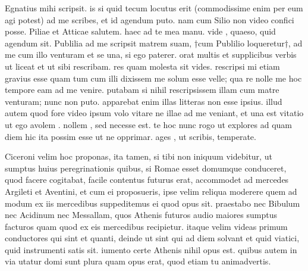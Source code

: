 


 Egnatius mihi scripsit. is si quid tecum locutus erit (commodissime enim per eum agi potest) ad me scribes, et id agendum puto. nam cum Silio non video confici posse. Piliae et Atticae salutem. haec ad te mea manu. vide , quaeso, quid agendum sit. Publilia ad me scripsit matrem suam, †cum Publilio loqueretur†, ad me cum illo venturam et se una, si ego paterer. orat multis et supplicibus verbis ut liceat et ut sibi rescribam. res quam molesta sit vides. rescripsi mi etiam gravius esse quam tum cum illi dixissem me solum esse velle; qua re nolle me hoc tempore eam ad me venire. putabam si nihil rescripsissem illam cum matre venturam; nunc non puto. apparebat enim illas litteras non esse ipsius. illud autem quod fore video ipsum volo vitare ne illae ad me veniant, et una est vitatio ut ego avolem . nollem , sed necesse est. te hoc nunc rogo ut explores ad quam diem hic ita possim esse ut ne opprimar. ages , ut scribis, temperate.

 Ciceroni velim hoc proponas, ita tamen, si tibi non iniquum videbitur, ut sumptus huius peregrinationis quibus, si Romae esset domumque conduceret, quod facere cogitabat, facile contentus futurus erat, accommodet ad mercedes Argileti et Aventini, et cum ei proposueris, ipse velim reliqua moderere quem ad modum ex iis mercedibus suppeditemus ei quod opus sit. praestabo nec Bibulum nec Acidinum nec Messallam, quos Athenis futuros audio maiores sumptus facturos quam quod ex eis mercedibus recipietur. itaque velim videas primum conductores qui sint et quanti, deinde ut sint qui ad diem solvant et quid viatici, quid instrumenti satis sit. iumento certe Athenis nihil opus est. quibus autem in via utatur domi sunt plura quam opus erat, quod etiam tu animadvertis.
